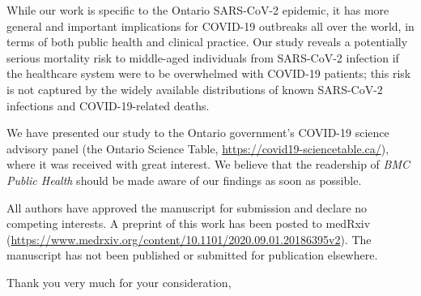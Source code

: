 \documentclass[12pt,letterpaper]{letter}
\newcommand{\journalname}{\emph{BMC Public Health}}
\begin{document}
While our work is specific to the Ontario SARS-CoV-2 epidemic, it has
more general and important implications for COVID-19 outbreaks all
over the world, in terms of both public health and clinical
practice. Our study reveals a potentially serious mortality risk to
middle-aged individuals from SARS-CoV-2 infection if the healthcare
system were to be overwhelmed with COVID-19 patients; this risk is not
captured by the widely available distributions of known SARS-CoV-2
infections and COVID-19-related deaths.

We have presented our study to the Ontario government's COVID-19
science advisory panel (the Ontario Science Table,
\url{https://covid19-sciencetable.ca/}), where it was received with
great interest.  We believe that the readership of \journalname{}
should be made aware of our findings as soon as possible.

All authors have approved the manuscript for submission and declare no competing interests. A preprint of this work has been posted to medRxiv (\url{https://www.medrxiv.org/content/10.1101/2020.09.01.20186395v2}). The manuscript has not been published or submitted for publication elsewhere.

Thank you very much for your consideration,
\end{document}
